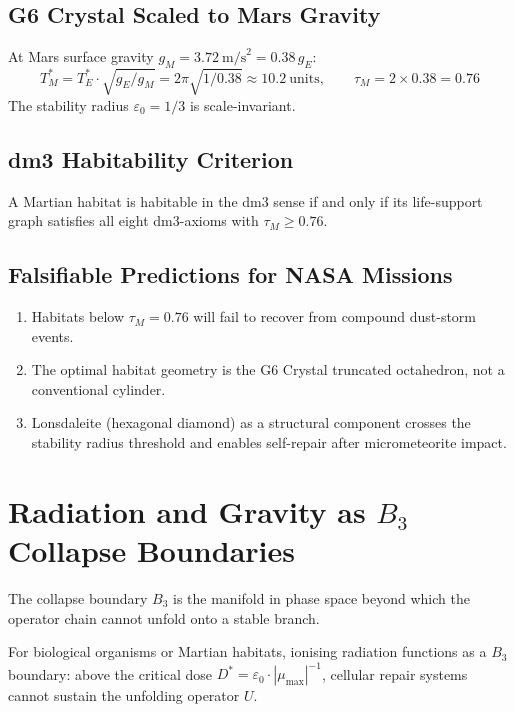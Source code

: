 \documentclass[11pt, twoside, openright]{book}
\theoremstyle{plain}
\theoremstyle{definition}
\newcommand{\eps}{\varepsilon_0}
\begin{document}
\section{G6 Crystal Scaled to Mars Gravity}

At Mars surface gravity $g_M = 3.72~\text{m/s}^2 = 0.38\,g_E$:
\[
T^*_M = T^*_E \cdot \sqrt{g_E/g_M} = 2\pi\sqrt{1/0.38} \approx 10.2~\text{units},
\qquad \tau_M = 2 \times 0.38 = 0.76
\]
The stability radius $\eps = 1/3$ is scale-invariant.

\section{dm3 Habitability Criterion}

A Martian habitat is habitable in the dm3 sense if and only if its
life-support graph satisfies all eight dm3-axioms with $\tau_M \ge 0.76$.

\section{Falsifiable Predictions for NASA Missions}

\begin{enumerate}[label=\arabic*.]
  \item Habitats below $\tau_M = 0.76$ will fail to recover from compound
    dust-storm events.
  \item The optimal habitat geometry is the G6 Crystal truncated
    octahedron, not a conventional cylinder.
  \item Lonsdaleite (hexagonal diamond) as a structural component crosses
    the stability radius threshold and enables self-repair after
    micrometeorite impact.
\end{enumerate}

\chapter{Radiation and Gravity as $B_3$ Collapse Boundaries}

The collapse boundary $B_3$ is the manifold in phase space beyond which
the operator chain cannot unfold onto a stable branch.

For biological organisms or Martian habitats, ionising radiation
functions as a $B_3$ boundary: above the critical dose
$D^* = \eps \cdot |\mu_{\max}|^{-1}$, cellular repair systems cannot
sustain the unfolding operator $U$.
\end{document}
